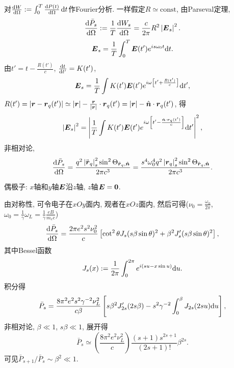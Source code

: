 对$\frac{\mathrm{d} W}{\mathrm{d} \Omega}:=\int_0^T\frac{\mathrm{d} P(t)}{\mathrm{d} \Omega}\,\mathrm{d} t$作Fourier分析. 一样假定$R\simeq\text{const}$, 由Parseval定理,
\begin{equation}
    \frac{\mathrm{d}\bar{P}_s}{\mathrm{d}\Omega}:=\frac{1}{T}\frac{\mathrm{d} W_s}{\mathrm{d}\Omega}=\frac{c}{2\pi}R^2
    \left\lvert\boldsymbol{E}_s\right\rvert^2.
\end{equation}
\begin{equation}
    \boldsymbol{E}_s=\frac{1}{T}\int_0^T \boldsymbol{E}(t')e^{is\omega_0 t}\mathrm{d} t.
\end{equation}
由$t'=t-\frac{R(t')}{c}$, $\frac{\mathrm{d} t}{\mathrm{d} t'}=K(t')$,
\begin{equation}
    \boldsymbol{E}_s=\frac{1}{T}\int K(t')\boldsymbol{E}(t')e^{i\omega \left[t'+\frac{R(t')}{c}\right]}\mathrm{d} t',
\end{equation}
$R(t')=\left\lvert\boldsymbol{r}-\boldsymbol{r}_q(t')\right\rvert\simeq\left\lvert\boldsymbol{r}\right\rvert-\frac{\boldsymbol{r}}{\left\lvert\boldsymbol{r}\right\rvert}\cdot\boldsymbol{r}_q(t')=\left\lvert\boldsymbol{r}\right\rvert-\hat{\boldsymbol{n}}\cdot\boldsymbol{r}_q(t')$, 得
\begin{equation}
    \left\lvert\boldsymbol{E}_s\right\rvert^2=\left\lvert\frac{1}{T}\int K(t')\boldsymbol{E}(t')e^{i\omega \left[t'-\frac{\hat{\boldsymbol{n}}\cdot\boldsymbol{r}_q(t')}{c}\right]}\mathrm{d} t'\right\rvert^2,
\end{equation}
非相对论,
\begin{equation}
    \frac{\mathrm{d}\bar{P}_s}{\mathrm{d}\Omega}
    =\frac{q^2\left\lvert{\ddot{\boldsymbol{r}}}_q\right\rvert_s^2\sin^2
    \Theta_{\ddot{\boldsymbol{r}}_q,\hat{\boldsymbol{n}}}}{2\pi c^3}
    =\frac{s^4\omega_0^4q^2\left\lvert{\boldsymbol{r}}_q\right\rvert_s^2\sin^2
    \Theta_{\ddot{\boldsymbol{r}}_q,\hat{\boldsymbol{n}}}}{2\pi c^3}.
\end{equation}

偶极子: $x$轴和$y$轴$\boldsymbol{E}$沿$z$轴, $z$轴$\boldsymbol{E}=\boldsymbol{0}$.

由对称性, 可令电子在$xOy$面内, 观者在$xOz$面内, 然后可得($\nu_0=\frac{\omega_0}{2\pi}$, $\omega_0=\frac{1}{\gamma}\omega_L=\frac{1}{\gamma}\frac{eB}{m_ec}$)
\begin{equation}
    \frac{\mathrm{d}\bar{P}_s}{\mathrm{d}\Omega}
    =\frac{2\pi e^2s^2\nu_0^2}{c}
    \left[\cot^2\theta J_s(s\beta\sin\theta)^2+\beta^2J_s'(s\beta\sin\theta)^2\right],
\end{equation}
其中Bessel函数
\begin{equation}
    J_s(x):=\frac{1}{2\pi}\int_0^{2\pi}e^{i(su-x\sin u)}\mathrm{d} u.
\end{equation}
积分得
\begin{equation}
    \bar{P}_s
    =\frac{8\pi^2e^2s^2\gamma^{-2}\nu_L^2}{c\beta}
    \left[s\beta^2J_{2s}'(2s\beta)-s^2\gamma^{-2}\int_0^\beta J_{2s}(2su)\mathrm{d} u\right],
\end{equation}
非相对论, $\beta\ll1$, $s\beta\ll1$, 展开得
\begin{equation}
    \bar{P}_s\simeq\left(\frac{8\pi^2e^2\nu_L^2}{c}\right)
    \frac{(s+1)s^{2s+1}}{(2s+1)!}\beta^{2s}.
\end{equation}
可见$\bar{P}_{s+1}/\bar{P}_s\sim\beta^2\ll1$.
